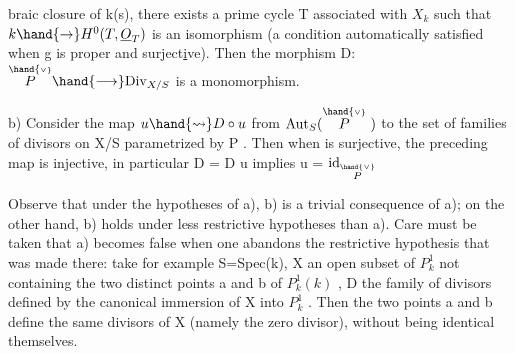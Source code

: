 braic closure of k(s), there exists a prime cycle T associated with $X_k$ such that
$k \hand{\to} H^0(T,\underline{O}_T)$ is an isomorphism (a condition automatically satisfied
when g is proper and surject\uline{i}ve). Then the morphism D: $\overset{\hand{\scriptscriptstyle\vee}}{P} \hand{\longrightarrow} \mathrm{Div}_{X/S}$ is
a monomorphism.

b)  Consider the map $u \hand{\rightsquigarrow} D\circ u$ from
$\mathrm{Aut}_S(\overset{\hand{\scriptscriptstyle\vee}}{P}\ )$ to the set of families of divisors on X/S parametrized
by P . Then when  is surjective, the preceding map is injective,
in particular D = D u implies u = $\mathrm{id}_{\overset{\hand{\scriptscriptstyle\vee}}{P}}$

Observe that under the hypotheses of a), b) is a trivial consequence
of a); on the other hand, b) holds under less restrictive
hypotheses than a). Care must be taken that a) becomes false when one abandons
the restrictive hypothesis that was made there: take for example
S=Spec(k), X an open subset of $P^1_k$ not containing the two distinct points
a and b of $P^1_k(k)$ , D the family of divisors defined by the
canonical immersion of X into $P^1_k$ . Then the two  points a and b
define the same divisors of X (namely the zero divisor), without being
identical themselves.

